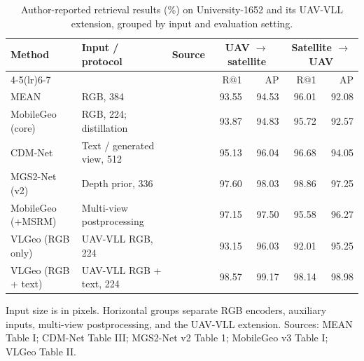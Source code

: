 \begin{table}[t]
\centering
\caption{Author-reported retrieval results (\%) on University-1652 and its UAV-VLL extension, grouped by input and evaluation setting.}
\label{tab:literature_context}
\fontsize{9}{10.5}\selectfont
\setlength{\tabcolsep}{3.3pt}
\renewcommand{\arraystretch}{1.12}
\begin{tabular}{lllrrrr}
\toprule
Method & Input / protocol & Source & \multicolumn{2}{c}{UAV $\rightarrow$ satellite} & \multicolumn{2}{c}{Satellite $\rightarrow$ UAV} \\
\cmidrule(lr){4-5}\cmidrule(lr){6-7} & & & R@1 & AP & R@1 & AP \\
\midrule
MEAN & RGB, 384 & \cite{mean2025} & 93.55 & 94.53 & 96.01 & 92.08 \\
MobileGeo (core) & RGB, 224; distillation & \cite{mobilegeo2026} & 93.87 & 94.83 & 95.72 & 92.57 \\
\midrule
CDM-Net & Text / generated view, 512 & \cite{cdmnet2025} & 95.13 & 96.04 & 96.68 & 94.05 \\
MGS2-Net (v2) & Depth prior, 336 & \cite{mgs2026v2} & 97.60 & 98.03 & 98.86 & 97.25 \\
\midrule
MobileGeo (+MSRM) & Multi-view postprocessing & \cite{mobilegeo2026} & 97.15 & 97.50 & 95.58 & 96.27 \\
\midrule
VLGeo (RGB only) & UAV-VLL RGB, 224 & \cite{vlgeo2026} & 93.15 & 96.03 & 92.01 & 95.25 \\
VLGeo (RGB + text) & UAV-VLL RGB + text, 224 & \cite{vlgeo2026} & 98.57 & 99.17 & 98.14 & 98.98 \\
\bottomrule
\end{tabular}
\par\vspace{2pt}\begin{minipage}{\textwidth}\fontsize{9}{10.5}\selectfont Input size is in pixels. Horizontal groups separate RGB encoders, auxiliary inputs, multi-view postprocessing, and the UAV-VLL extension. Sources: MEAN Table I; CDM-Net Table III; MGS2-Net v2 Table 1; MobileGeo v3 Table I; VLGeo Table II.\end{minipage}
\end{table}
